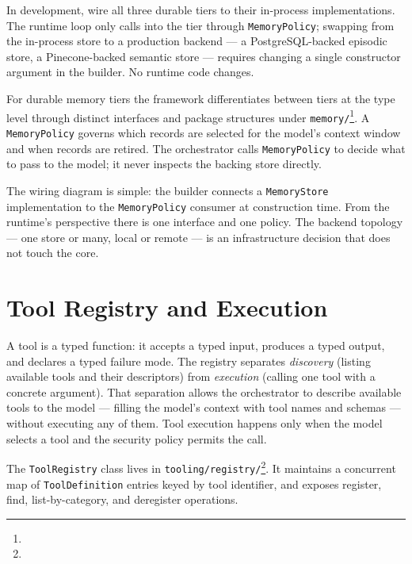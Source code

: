 \begin{tipbox}
In development, wire all three durable tiers to their in-process
implementations.  The runtime loop only calls into the tier through
\texttt{MemoryPolicy}; swapping from the in-process store to a
production backend — a PostgreSQL-backed episodic store, a
Pinecone-backed semantic store — requires changing a single constructor
argument in the builder.  No runtime code changes.
\end{tipbox}

For durable memory tiers the framework differentiates between tiers at the type level
through distinct interfaces and package structures under
\texttt{memory/}\footnote{}.
A \texttt{MemoryPolicy} governs which records are selected for the model's context
window and when records are retired.
The orchestrator calls \texttt{MemoryPolicy} to decide what to pass to the model;
it never inspects the backing store directly.

\begin{notebox}
  The wiring diagram is simple: the builder connects a \texttt{MemoryStore}
  implementation to the \texttt{MemoryPolicy} consumer at construction time.
  From the runtime's perspective there is one interface and one policy.
  The backend topology — one store or many, local or remote — is an
  infrastructure decision that does not touch the core.
\end{notebox}

\section{Tool Registry and Execution}
\label{sec:tools}

A tool is a typed function: it accepts a typed input, produces a typed output, and
declares a typed failure mode.
The registry separates \emph{discovery} (listing available tools and their
descriptors) from \emph{execution} (calling one tool with a concrete argument).
That separation allows the orchestrator to describe available tools to the model
— filling the model's context with tool names and schemas — without executing any
of them.
Tool execution happens only when the model selects a tool and the security policy
permits the call.

The \texttt{ToolRegistry} class lives in
\texttt{tooling/registry/}\footnote{}.
It maintains a concurrent map of \texttt{ToolDefinition} entries keyed by tool
identifier, and exposes register, find, list-by-category, and deregister operations.

